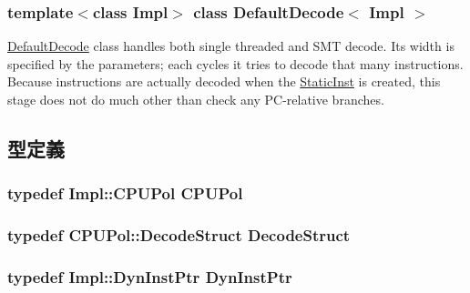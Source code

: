 \subsubsection*{template$<$class Impl$>$ class DefaultDecode$<$ Impl $>$}

\hyperlink{classDefaultDecode}{DefaultDecode} class handles both single threaded and SMT decode. Its width is specified by the parameters; each cycles it tries to decode that many instructions. Because instructions are actually decoded when the \hyperlink{classStaticInst}{StaticInst} is created, this stage does not do much other than check any PC-\/relative branches. 

\subsection{型定義}
\hypertarget{classDefaultDecode_a87d662eaeb9eab249d671b63cb4ba11a}{
\subsubsection[{CPUPol}]{\setlength{\rightskip}{0pt plus 5cm}typedef Impl::CPUPol {\bf CPUPol}}}
\label{classDefaultDecode_a87d662eaeb9eab249d671b63cb4ba11a}
\hypertarget{classDefaultDecode_a38077cd156cf219016abf92d8c5b523b}{
\subsubsection[{DecodeStruct}]{\setlength{\rightskip}{0pt plus 5cm}typedef CPUPol::DecodeStruct {\bf DecodeStruct}}}
\label{classDefaultDecode_a38077cd156cf219016abf92d8c5b523b}
\hypertarget{classDefaultDecode_a028ce10889c5f6450239d9e9a7347976}{
\subsubsection[{DynInstPtr}]{\setlength{\rightskip}{0pt plus 5cm}typedef Impl::DynInstPtr {\bf DynInstPtr}}}
